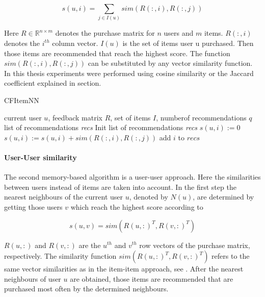 \documentclass[10pt]{reportMaster}
\begin{document}
\begin{equation}
	 s(u,i) = \sum_{j \in I(u)}{sim(R(:,i), R(:,j))}
\end{equation}

Here $R \in \mathds{R}^{n \times m}$ denotes the purchase matrix for $n$ users and $m$ items. $R(:,i)$ denotes the $i^{th}$ column vector. $I(u)$ is the set of items user u purchased.
Then those items are recommended that reach the highest score. %
The function $sim(R(:,i), R(:,j))$ can be substituted by any vector similarity function.
In this thesis experiments were performed using cosine similarity or the Jaccard coefficient explained in section. %

\begin{algorithm}
	\caption{CFItemNN}
	\label{alg:CFItemNN}
	\begin{algorithmic}[1]
		\Require current user $u$, feedback matrix $R$, set of items $I$, numberof recommendations $q$
		\Ensure list of recommendations \textit{recs}
		\State Init list of recommendations \textit{recs}
			\State $s(u,i) := 0$
				\State $s(u,i) := s(u,i) + sim(R(:,i), R(:,j))$ 
			\EndFor
				\State add $i$ to $recs$
			\EndIf
		\EndFor
	\end{algorithmic}
	
\end{algorithm}


\paragraph{User-User similarity}
The second memory-based algorithm is a user-user approach. %
Here the similarities between users instead of items are taken into account.
In the first step the nearest neighbours of the current user $u$, denoted by $N(u)$, are determined by getting those users $v$ which reach the highest score according to

\begin{equation}
	s(u,v) = sim(R(u,:)^T, R(v, :)^T)
\end{equation}

$R(u,:)$ and $R(v,:)$ are the $u^{th}$ and $v^{th}$ row vectors of the purchase matrix, respectively.
The similarity function $sim(R(u,:)^T, R(v, :)^T)$ refers to the same vector similarities as in the item-item approach, see . %
After the nearest neighbours of user $u$ are obtained, those items are recommended that are purchased most often by the determined neighbours. %
\end{document}
